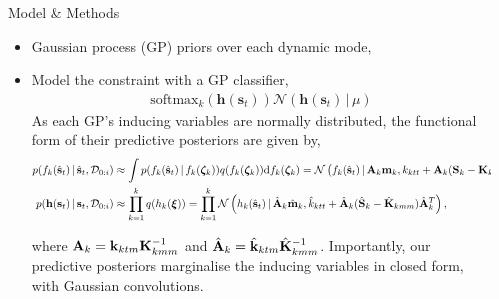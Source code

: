 \documentclass[final,12pt]{beamer}
\newlength{\sepwidth}
\newlength{\colwidth}
\newcommand{\separatorcolumn}{\begin{column}{\sepwidth}\end{column}}
\renewcommand{\mid}{\,|\,}
\newcommand{\numData}{\ensuremath{t}}
\newcommand{\modeInd}{\ensuremath{k}}
\newcommand{\ModeInd}{\ensuremath{\MakeUppercase{\modeInd}}}
\newcommand{\mode}[1]{\ensuremath{#1_{\modeInd}}}
\newcommand{\state}{\ensuremath{\mathbf{x}}}
\newcommand{\x}{\ensuremath{\mathbf{x}}}
\newcommand{\dataset}{\ensuremath{\mathcal{D}}}
\newcommand{\singleInput}{\ensuremath{\x_{\numData-1}}}
\newcommand{\gatingFunc}{\ensuremath{h}}
\newcommand{\GatingFunc}{\ensuremath{\mathbf{\gatingFunc}}}
\newcommand{\latentFunc}{\ensuremath{f}}
\newcommand{\timeInd}{\ensuremath{t}}
\renewcommand{\state}{\ensuremath{\mathbf{s}}}
\renewcommand{\mode}[1]{\ensuremath{#1_{\modeInd}}}
\renewcommand{\numData}{\ensuremath{n}}
\renewcommand{\singleInput}{\ensuremath{\mathbf{x}_{\numData}}}
\newcommand{\expertKernelnn}{\ensuremath{k_{\modeInd \numData \numData}}}
\newcommand{\expertKernelnM}{\ensuremath{\mathbf{k}_{\modeInd \numData \NumInducing}}}
\newcommand{\expertKernelMM}{\ensuremath{\mathbf{K}_{\modeInd \NumInducing \NumInducing}}}
\newcommand{\gatingKernelnn}{\ensuremath{\hat{k}_{\modeInd \numData \numData}}}
\newcommand{\gatingKernelnM}{\ensuremath{\hat{\mathbf{k}}_{\modeInd \numData \NumInducing}}}
\newcommand{\gatingKernelMM}{\ensuremath{\hat{\mathbf{K}}_{\modeInd \NumInducing \NumInducing}}}
\newcommand{\numInducing}{\ensuremath{m}}
\newcommand{\NumInducing}{\ensuremath{\MakeUppercase{\numInducing}}}
\newcommand{\expertInducingInput}{\ensuremath{\mode{\bm{\zeta}}}}
\newcommand{\gatingInducingInput}{\ensuremath{\bm{\xi}}}
\renewcommand{\dataset}{\ensuremath{\mathcal{D}}}
\renewcommand{\numData}{\ensuremath{t}}
\renewcommand{\singleInput}{\ensuremath{\hat{\mathbf{s}}_{\timeInd}}}
\begin{document}
\begin{frame}[t]
\begin{columns}[t]
\begin{column}{\colwidth}
  \begin{block}{Model \& Methods}
    \begin{itemize}
      \item Gaussian process (GP) priors over each dynamic mode,
      \item Model the constraint with a GP classifier,
            \begin{align}
              \text{softmax}_{\modeInd}(\GatingFunc(\state_{\timeInd})) \mathcal{N} \left(\GatingFunc(\state_{\timeInd}) \mid \mu \right)
            \end{align}
As each GP's inducing variables are normally distributed, the functional form of their predictive posteriors are given by,
\begin{align}
\label{eq--variational-posteriors-functional-experts}
p(\mode{\latentFunc}(\singleInput) \mid \singleInput, \dataset_{0:i})
&\approx \int p(\mode{\latentFunc}(\singleInput) \mid \mode{\latentFunc}(\expertInducingInput))
q(\mode{\latentFunc}(\expertInducingInput)) \text{d} \mode{\latentFunc}(\expertInducingInput)
= \mathcal{N} \left( \mode{\latentFunc}(\singleInput) \mid
\mode{\mathbf{A}} \mode{\mathbf{m}},
\expertKernelnn
+ \mode{\mathbf{A}}
(\mode{\mathbf{S}} - \expertKernelMM)
\mode{\mathbf{A}}^T
\right) \\
p(\GatingFunc(\state_{\timeInd}) \mid \state_{\timeInd}, \dataset_{0:i})
&\approx \prod_{\modeInd=1}^\ModeInd q(\mode{\gatingFunc}(\gatingInducingInput))
= \prod_{\modeInd=1}^\ModeInd \mathcal{N} \left( \mode{\gatingFunc}(\singleInput) \mid
\mode{\hat{\mathbf{A}}} \mode{\hat{\mathbf{m}}},
\gatingKernelnn
+ \mode{\hat{\mathbf{A}}}
(\mode{\hat{\mathbf{S}}} - \gatingKernelMM)
\mode{\hat{\mathbf{A}}}^T
\right), \label{eq--variational-posteriors-functional-gating}
\end{align}

where
\(\mode{\mathbf{A}} = \expertKernelnM \expertKernelMM^{-1}\) and
\(\mode{\hat{\mathbf{A}}} = \gatingKernelnM \gatingKernelMM^{-1}\).
Importantly, our predictive posteriors marginalise the inducing variables in closed form, with Gaussian convolutions.
    \end{itemize}
  \end{block}

\end{column}

\separatorcolumn


\end{columns}
\end{frame}
\end{document}
